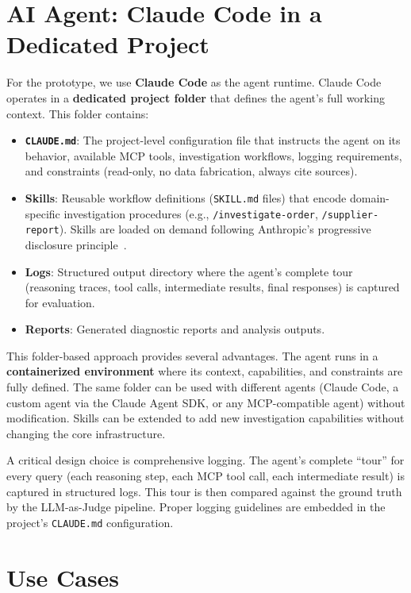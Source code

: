 \documentclass[12pt,a4paper]{report}
\begin{document}
\section{AI Agent: Claude Code in a Dedicated Project}

For the prototype, we use \textbf{Claude Code} as the agent runtime. Claude Code operates in a \textbf{dedicated project folder} that defines the agent's full working context. This folder contains:

\begin{itemize}[itemsep=0.3em]
    \item \textbf{\texttt{CLAUDE.md}}: The project-level configuration file that instructs the agent on its behavior, available MCP tools, investigation workflows, logging requirements, and constraints (read-only, no data fabrication, always cite sources).
    \item \textbf{Skills}: Reusable workflow definitions (\texttt{SKILL.md} files) that encode domain-specific investigation procedures (e.g., \texttt{/investigate-order}, \texttt{/supplier-report}). Skills are loaded on demand following Anthropic's progressive disclosure principle~\cite{anthropic2025skills}.
    \item \textbf{Logs}: Structured output directory where the agent's complete tour (reasoning traces, tool calls, intermediate results, final responses) is captured for evaluation.
    \item \textbf{Reports}: Generated diagnostic reports and analysis outputs.
\end{itemize}

This folder-based approach provides several advantages. The agent runs in a \textbf{containerized environment} where its context, capabilities, and constraints are fully defined. The same folder can be used with different agents (Claude Code, a custom agent via the Claude Agent SDK, or any MCP-compatible agent) without modification. Skills can be extended to add new investigation capabilities without changing the core infrastructure.

A critical design choice is comprehensive logging. The agent's complete ``tour'' for every query (each reasoning step, each MCP tool call, each intermediate result) is captured in structured logs. This tour is then compared against the ground truth by the LLM-as-Judge pipeline. Proper logging guidelines are embedded in the project's \texttt{CLAUDE.md} configuration.

\section{Use Cases}
\end{document}
